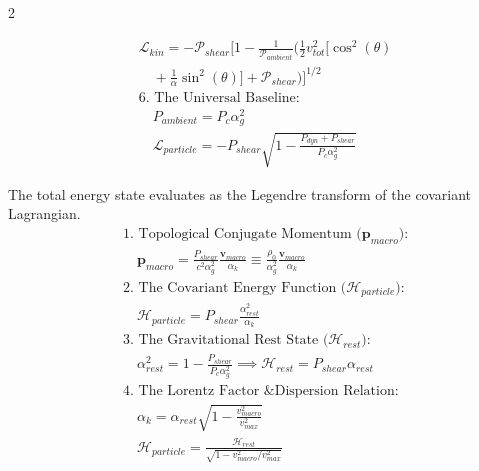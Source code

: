 \begin{multicols}{2}
\begin{tcolorbox}
\begin{align}
    &\mathcal{L}_{kin} = - \mathcal{P}_{shear} \Bigg[ 1 - \frac{1}{\mathcal{P}_{ambient}} \Bigg( \frac{1}{2} v_{tot}^2 \Big[ \cos^2(\theta) \nonumber \\
    &\quad + \frac{1}{\alpha}\sin^2(\theta) \Big] + \mathcal{P}_{shear} \Bigg) \Bigg]^{1/2} \label{eq:angular_lagrangian} \\
    &\text{6. The Universal Baseline:} \nonumber \\
    &\quad P_{ambient} = P_c \alpha_g^2 \label{eq:gravitational_compliance} \\
    &\quad \mathcal{L}_{particle} = - P_{shear} \sqrt{1 - \frac{P_{dyn} + P_{shear}}{P_c \alpha_g^2}} \label{eq:nested_lagrangian}
\end{align}
\end{tcolorbox}

\begin{tcolorbox}[cheatbox, title={\refstepcounter{cheatnum}\label{box:legendre_hamiltonian}\thecheatnum. The Legendre Hamiltonian Translation \\ \null\hfill\makebox[0pt][r]{\scriptsize\hyperref[sec:deriv_legendre_hamiltonian]{[Proof $\downarrow$]}}}]
The total energy state evaluates as the Legendre transform of the covariant Lagrangian.
\begin{align}
    &\text{1. Topological Conjugate Momentum ($\mathbf{p}_{macro}$):} \nonumber \\
    &\quad \mathbf{p}_{macro} = \frac{P_{shear}}{c^2 \alpha_g^2} \frac{\mathbf{v}_{macro}}{\alpha_k} \equiv \frac{\rho_0}{\alpha_g^2} \frac{\mathbf{v}_{macro}}{\alpha_k} \label{eq:conjugate_momentum} \\
    &\text{2. The Covariant Energy Function ($\mathcal{H}_{particle}$):} \nonumber \\
    &\quad \mathcal{H}_{particle} = P_{shear} \frac{\alpha_{rest}^2}{\alpha_k} \label{eq:covariant_hamiltonian} \\
    &\text{3. The Gravitational Rest State ($\mathcal{H}_{rest}$):} \nonumber \\
    &\quad \alpha_{rest}^2 = 1 - \frac{P_{shear}}{P_c \alpha_g^2} \implies \mathcal{H}_{rest} = P_{shear} \alpha_{rest} \label{eq:hamiltonian_rest_mass} \\
    &\text{4. The Lorentz Factor \& Dispersion Relation:} \nonumber \\
    &\quad \alpha_k = \alpha_{rest} \sqrt{1 - \frac{v_{macro}^2}{v_{max}^2}} \label{eq:lorentz_compliance} \\
    &\quad \mathcal{H}_{particle} = \frac{\mathcal{H}_{rest}}{\sqrt{1 - v_{macro}^2/v_{max}^2}} \label{eq:relativistic_energy} \\

\end{align}
\end{tcolorbox}
\end{multicols}
